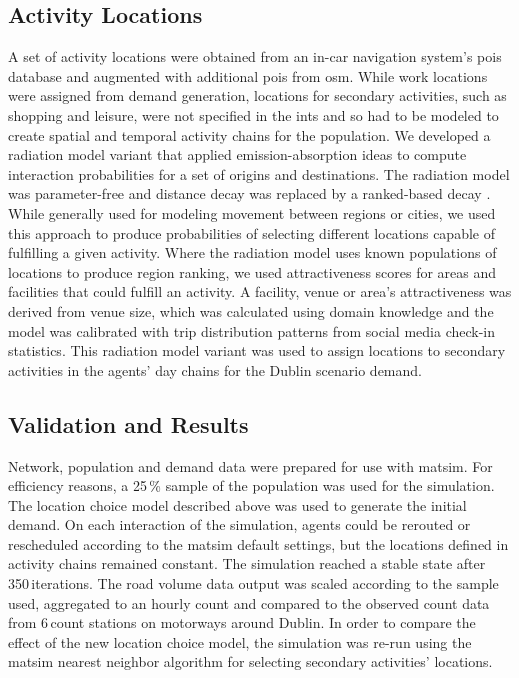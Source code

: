 \subsection{Activity Locations}
A set of activity locations were obtained from an in-car navigation system’s \glspl{poi} database and augmented with additional \glspl{poi} from \gls{osm}. While work locations were assigned from demand generation, locations for secondary activities, such as shopping and leisure, were not specified in the \gls{ints} and so had to be modeled to create spatial and temporal activity chains for the population. We developed a radiation model variant that applied emission-absorption ideas to compute interaction probabilities for a set of origins and destinations. The radiation model was parameter-free and distance decay was replaced by a ranked-based decay \citep[][]{SiminiEtAl_NAT_2012}. While generally used for modeling movement between regions or cities, we used this approach to produce probabilities of selecting different locations capable of fulfilling a given activity. Where the radiation model uses known populations of locations to produce region ranking, we used attractiveness scores for areas and facilities that could fulfill an activity. A facility, venue or area's attractiveness was derived from venue size, which was calculated using domain knowledge and the model was calibrated with trip distribution patterns from social media check-in statistics. This radiation model variant was used to assign locations to secondary activities in the agents’ day chains for the Dublin scenario demand.

\subsection{Validation and Results}
Network, population and demand data were prepared for use with \gls{matsim}. For efficiency reasons, a 25\,\% sample of the population was used for the simulation. The location choice model described above was used to generate the initial demand. On each interaction of the simulation, agents could be rerouted or rescheduled according to the \gls{matsim} default settings, but the locations defined in activity chains remained constant. The simulation reached a stable state after 350\,iterations. The road volume data output was scaled according to the sample used, aggregated to an hourly count and compared to the observed count data from 6\,count stations on motorways around Dublin. In order to compare the effect of the new location choice model, the simulation was re-run using the \gls{matsim} nearest neighbor algorithm for selecting secondary activities' locations.

